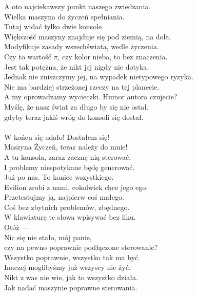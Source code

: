 \charnad{}
A oto najciekawszy punkt naszego zwiedzania.\\
Wielka maszyna do życzeń spełniania.\\
Tutaj widać tylko dwie konsole.\\
Większość maszyny znajduje się pod ziemią, na dole.\\
Modyfikuje zasady wszechświata, wedle życzenia.\\
Czy to wartość $\pi$, czy kolor nieba, to bez znaczenia.\\
Jest tak potężna, że nikt jej nigdy nie dotyka.\\
Jednak nie zniszczymy jej, na wypadek nietypowego ryzyka.\\
Nie ma bardziej strzeżonej rzeczy na tej planecie.\\
A my oprowadzamy wycieczki. Humor autora czujecie?\\
Myślę, że nasz świat za długo by się nie ostał,\\
gdyby teraz jakiś wróg do konsoli się dostał.\\

\\

\chardok{}
W końcu się udało! Dostałem się!\\
Maszyna Życzeń, teraz należy do mnie!\\
A tu konsola, zaraz zacznę nią sterować.\\
I problemy niespotykane będę generować.\\

\charmik{}
Już po nas. To koniec wszystkiego.\\
Evilion zrobi z nami, cokolwiek chce jego ego.\\

\chardok{}
Przetestujmy ją, najpierw coś małego.\\
Coś bez zbytnich problemów, zbędnego.\\
W klawiaturę te słowa wpisywać bez liku.\\
Otóż --- \\

\charprzy{}
Nic się nie stało, mój panie,\\
czy na pewno poprawnie podłączone sterowanie?\\

\charmik{}
Wszystko poprawnie, wszystko tak ma być.\\
Inaczej moglibyśmy już wszyscy nie żyć.\\
Nikt z was nie wie, jak to wszystko działa.\\
Jak nadać maszynie poprawne sterowania.\\

